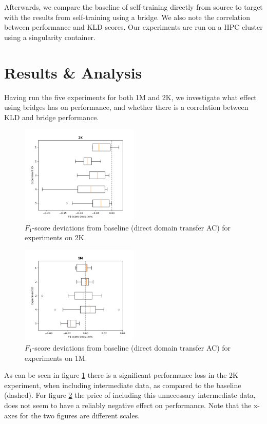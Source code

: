 \documentclass[11pt,a4paper]{article}
\begin{document}
Afterwards, we compare the baseline of self-training directly from source to target with the results from self-training using a bridge. We also note the correlation between performance and KLD scores.
Our experiments are run on a HPC cluster using a singularity container.

\section*{Results \& Analysis}
Having run the five experiments for both 1M and 2K, we investigate what effect using bridges has on performance, and whether there is a correlation between KLD and bridge performance.

\begin{figure}[h]
    \centering
    \includegraphics[width=0.5\textwidth]{report/boxplots_2K.png}
    \caption{$F_1$-score deviations from baseline (direct domain transfer A\textrightarrow C) for experiments on 2K.}
    \label{fig:box_2k}
\end{figure}
\begin{figure}[h]
    \centering
    \includegraphics[width=0.5\textwidth]{report/boxplots_1M.png}
    \caption{$F_1$-score deviations from baseline (direct domain transfer A\textrightarrow C) for experiments on 1M.}
    \label{fig:box_1M}
\end{figure}
As can be seen in figure \ref{fig:box_2k} there is a significant performance loss in the 2K experiment, when including intermediate data, as compared to the baseline (dashed).
For figure \ref{fig:box_1M} the price of including this unnecessary intermediate data, does not seem to have a reliably negative effect on performance. Note that the x-axes for the two figures are different scales.
\end{document}
